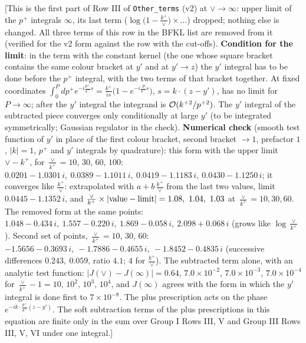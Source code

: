 \documentclass[9pt]{article}
\numberwithin{equation}{section}
\begin{document}
{\color{red}[This is the first part of Row III of \texttt{Other\_terms} (v2) at $\vee\to\infty$: upper limit of the $p^{+}$ integrals $\infty$, its last term ($\log\big(1-\frac{k^{+}}{\vee}\big)\times\dots$) dropped; nothing else is changed. All three terms of this row in the BFKL list are removed from it (verified for the v2 form against the row with the cut-offs). \textbf{Condition for the limit}: in the term with the constant kernel (the one whose square bracket contains the same colour bracket at $y'$ and at $y'\to z$) the $y'$ integral has to be done before the $p^{+}$ integral, with the two terms of that bracket together. At fixed coordinates $\int_{0}^{P}dp^{+}e^{-i\frac{p^{+}}{k^{+}}s}=\frac{k^{+}}{is}\big(1-e^{-i\frac{P}{k^{+}}s}\big)$, $s=k\cdot(z-y')$, has no limit for $P\to\infty$; after the $y'$ integral the integrand is ${\cal O}(k^{+2}/p^{+2})$. The $y'$ integral of the subtracted piece converges only conditionally at large $y'$ (to be integrated symmetrically; Gaussian regulator in the check). \textbf{Numerical check} (smooth test function of $y'$ in place of the first colour bracket, second bracket $\to1$, prefactor $1$, $|k|=1$, $p^{+}$ and $y'$ integrals by quadrature): this form with the upper limit $\vee-k^{+}$, for $\frac{\vee}{k^{+}}=10,\,30,\,60,\,100$: $0.0201-1.0301\,i,\ 0.0389-1.1011\,i,\ 0.0419-1.1183\,i,\ 0.0430-1.1250\,i$; it converges like $\frac{k^{+}}{\vee}$: extrapolated with $a+b\,\frac{k^{+}}{\vee}$ from the last two values, limit $0.0445-1.1352\,i$, and $\frac{\vee}{k^{+}}\times|{\rm value}-{\rm limit}|=1.08,\ 1.04,\ 1.03$ at $\frac{\vee}{k^{+}}=10,30,60$. The removed form at the same points: $1.048-0.434\,i,\ 1.557-0.220\,i,\ 1.869-0.058\,i,\ 2.098+0.068\,i$ (grows like $\log\frac{\vee}{k^{+}}$). Second set of points, $\frac{\vee}{k^{+}}=10,\,30,\,60$: $-1.5656-0.3693\,i,\ -1.7886-0.4655\,i,\ -1.8452-0.4835\,i$ (successive differences $0.243,\ 0.059$, ratio $4.1$; $4$ for $\frac{k^{+}}{\vee}$). The subtracted term alone, with an analytic test function: $|J(\vee)-J(\infty)|=0.64$, $7.0\times10^{-2}$, $7.0\times10^{-3}$, $7.0\times10^{-4}$ for $\frac{\vee}{k^{+}}-1=10,\,10^{2},\,10^{3},\,10^{4}$, and $J(\infty)$ agrees with the form in which the $y'$ integral is done first to $7\times10^{-8}$. The plus prescription acts on the phase $e^{-ik\cdot\frac{p^{+}}{k^{+}}(z-y')}$. The soft subtraction terms of the plus prescriptions in this equation are finite only in the sum over Group I Rows III, V and Group III Rows III, V, VI under one integral.]}\par\noindent
\end{document}
